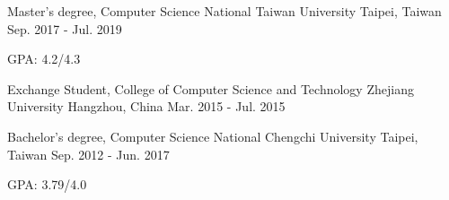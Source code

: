 

\begin{cventries}


  \cventry
    {Master's degree, Computer Science} %
    {National Taiwan University} %
    {Taipei, Taiwan} %
    {Sep. 2017 - Jul. 2019} %
    {
      \begin{cvitems} %
        \item {GPA: 4.2/4.3}
      \end{cvitems}
    }


  \cventry
    {Exchange Student, College of Computer Science and Technology} %
    {Zhejiang University} %
    {Hangzhou, China} %
    {Mar. 2015 - Jul. 2015} %
    {
    }


  \cventry
    {Bachelor's degree, Computer Science} %
    {National Chengchi University} %
    {Taipei, Taiwan} %
    {Sep. 2012 - Jun. 2017} %
    {
      \begin{cvitems} %
        \item {GPA: 3.79/4.0}
      \end{cvitems}
    }

\end{cventries}
